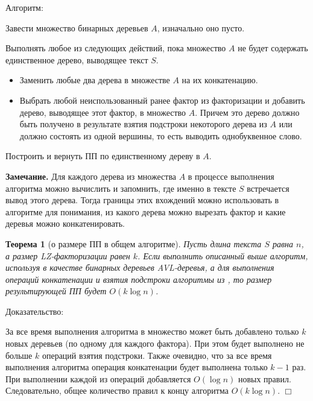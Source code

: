 \documentclass[14pt]{article}
\newtheorem{theorem}{Теорема}[section]
\begin{document}
{\sc Алгоритм:}
\begin{enumerate}
	\begin{item}
		Завести множество бинарных деревьев $A$, изначально оно пусто.
	\end{item}
	\begin{item}
		Выполнять любое из следующих действий, пока множество $A$ не будет содержать единственное дерево, выводящее текст $S$.
		\begin{itemize}
			\item Заменить любые два дерева в множестве $A$ на их конкатенацию.
			\item Выбрать любой неиспользованный ранее фактор из факторизации и добавить дерево, выводящее этот фактор, в множество $A$.
			Причем это дерево должно быть получено в результате взятия подстроки некоторого дерева из $A$
			или должно состоять из одной вершины, то есть выводить однобуквенное слово.
		\end{itemize}
	\end{item}
	\begin{item}
		Построить и вернуть ПП по единственному дереву в $A$.
	\end{item}
\end{enumerate}

{\bf Замечание.} Для каждого дерева из множества $A$ в процессе выполнения алгоритма можно вычислить и запомнить,
где именно в тексте $S$ встречается вывод этого дерева. Тогда границы этих вхождений можно использовать в алгоритме для
понимания, из какого дерева можно вырезать фактор и какие деревья можно конкатенировать.

\begin{theorem}[о размере ПП в общем алгоритме]
	Пусть длина текста $S$ равна $n$, а размер LZ-факторизации равен $k$. Если выполнить описанный выше алгоритм,
	используя в качестве бинарных деревьев AVL-деревья, а для выполнения операций конкатенации и взятия подстроки
	алгоритмы из \cite{RytterSLPConstruction}, то размер результирующей ПП будет $O(k\log n)$.
\end{theorem}

{\sc Доказательство:}

За все время выполнения алгоритма в множество может быть добавлено только $k$ новых деревьев
(по одному для каждого фактора). При этом будет выполнено не больше $k$ операций взятия подстроки.
Также очевидно, что за все время выполнения алгоритма операция конкатенации будет выполнена только $k-1$ раз. При выполнении каждой из
операций добавляется $O(\log n)$ новых правил. Следовательно, общее количество правил к концу алгоритма $O(k\log n)$. $\Box$
\end{document}
